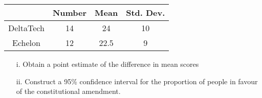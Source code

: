 \documentclass[]{article}
\begin{document}
\begin{itemize}
\begin{center}
\begin{tabular}{|c|c|c|c|}

  \hline
&Number&Mean&Std. Dev.\\ \hline
DeltaTech&14&24&10\\
Echelon&12&22.5&9\\
  \hline
\end{tabular}
\end{center}

\begin{itemize}
\item [i.] Obtain a point estimate of the difference in mean scores
\item [ii.] Construct a 95\% confidence interval for the proportion of people in favour of the constitutional amendment.
\end{itemize}
\end{itemize}
\end{document}
